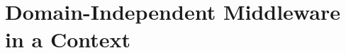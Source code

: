 \documentclass[a4paper, 10pt]{book}
\begin{document}

                \section{Domain-Independent Middleware in a \MMORG Context}
\end{document}
